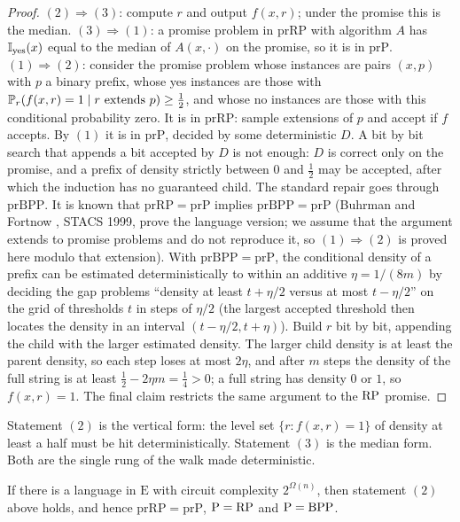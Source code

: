 \begin{proof}
$(2) \Rightarrow (3)$: compute $r$ and output $f(x, r)$; under the promise this is the median. $(3) \Rightarrow (1)$: a promise problem in $\mathrm{prRP}$ with algorithm $A$ has $\mathbb{I}_{\text{yes}}(x)$ equal to the median of $A(x, \cdot)$ on the promise, so it is in $\mathrm{prP}$. $(1) \Rightarrow (2)$: consider the promise problem whose instances are pairs $(x, p)$ with $p$ a binary prefix, whose yes instances are those with $\mathbb{P}_r( f(x, r) = 1 \mid r \text{ extends } p ) \ge \tfrac12$, and whose no instances are those with this conditional probability zero. It is in $\mathrm{prRP}$: sample extensions of $p$ and accept if $f$ accepts. By $(1)$ it is in $\mathrm{prP}$, decided by some deterministic $D$. A bit by bit search that appends a bit accepted by $D$ is not enough: $D$ is correct only on the promise, and a prefix of density strictly between $0$ and $\tfrac12$ may be accepted, after which the induction has no guaranteed child. The standard repair goes through $\mathrm{prBPP}$. It is known that $\mathrm{prRP} = \mathrm{prP}$ implies $\mathrm{prBPP} = \mathrm{prP}$ (Buhrman and Fortnow \cite{BF}, STACS 1999, prove the language version; we assume that the argument extends to promise problems and do not reproduce it, so $(1) \Rightarrow (2)$ is proved here modulo that extension). With $\mathrm{prBPP} = \mathrm{prP}$, the conditional density of a prefix can be estimated deterministically to within an additive $\eta = 1/(8m)$ by deciding the gap problems ``density at least $t + \eta/2$ versus at most $t - \eta/2$'' on the grid of thresholds $t$ in steps of $\eta/2$ (the largest accepted threshold then locates the density in an interval $(t - \eta/2, t + \eta)$). Build $r$ bit by bit, appending the child with the larger estimated density. The larger child density is at least the parent density, so each step loses at most $2\eta$, and after $m$ steps the density of the full string is at least $\tfrac12 - 2 \eta m = \tfrac14 > 0$; a full string has density $0$ or $1$, so $f(x, r) = 1$. The final claim restricts the same argument to the $\mathrm{RP}$ promise.
\end{proof}

Statement $(2)$ is the vertical form: the level set $\{ r : f(x, r) = 1 \}$ of density at least a half must be hit deterministically. Statement $(3)$ is the median form. Both are the single rung of the walk made deterministic.

\begin{theorem}
If there is a language in $\mathrm{E}$ with circuit complexity $2^{\Omega(n)}$, then statement $(2)$ above holds, and hence $\mathrm{prRP} = \mathrm{prP}$, $\mathrm{P} = \mathrm{RP}$ and $\mathrm{P} = \mathrm{BPP}$.
\end{theorem}

